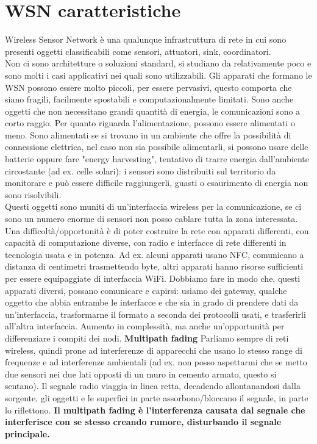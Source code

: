 \documentclass[12pt,italian]{report}
\begin{document}
\section{WSN caratteristiche}
\label{sec:WSNcar}
Wireless Sensor Network è una qualunque infrastruttura di rete in cui sono presenti oggetti classificabili come sensori, attuatori, sink, coordinatori. \\ Non ci sono architetture o soluzioni standard, si studiano da relativamente poco e sono molti i casi applicativi nei quali sono utilizzabili. 
\bigbreak
Gli apparati che formano le WSN possono essere molto piccoli, per essere pervasivi, questo comporta che siano fragili, facilmente spostabili e computazionalmente limitati. Sono anche oggetti che non necessitano grandi quantità di energia, le comunicazioni sono a corto raggio. 
\bigbreak
Per quanto riguarda l'alimentazione, possono essere alimentati o meno. Sono alimentati se si trovano in un ambiente che offre la possibilità di connessione elettrica, nel caso non sia possibile alimentarli, si possono usare delle batterie oppure fare "energy harvesting", tentativo di trarre energia dall'ambiente circostante (ad ex. celle solari): i sensori sono distribuiti sul territorio da monitorare e può essere difficile raggiungerli, guasti o esaurimento di energia non sono risolvibili. \\ Questi oggetti sono muniti di un'interfaccia wireless per la comunicazione, se ci sono un numero enorme di sensori non posso cablare tutta la zona interessata. 
\bigbreak
Una difficoltà/opportunità è di poter costruire la rete con apparati differenti, con capacità di computazione diverse, con radio e interfacce di rete differenti in tecnologia usata e in potenza. Ad ex. alcuni apparati usano NFC, comunicano a distanza di centimetri trasmettendo byte, altri apparati hanno risorse sufficienti per essere equipaggiate di interfaccia WiFi. Dobbiamo fare in modo che, questi apparati diversi, possano comunicare e capirsi: usiamo dei gateway, qualche oggetto che abbia entrambe le interfacce e che sia in grado di prendere dati da un'interfaccia, trasformarne il formato a seconda dei protocolli usati, e trasferirli all'altra interfaccia. Aumento in complessità, ma anche un'opportunità per differenziare i compiti dei nodi. 
\bigbreak
\noindent \textbf{Multipath fading}
\bigbreak
\noindent Parliamo sempre di reti wireless, quindi prone ad interferenze di apparecchi che usano lo stesso range di frequenze e ad interferenze ambientali (ad ex. non posso aspettarmi che se metto due sensori nei due lati opposti di un muro in cemento armato, questo si sentano). Il segnale radio viaggia in linea retta, decadendo allontanandosi dalla sorgente, gli oggetti e le superfici in parte assorbono/bloccano il segnale, in parte lo riflettono. \textbf{Il multipath fading è l'interferenza causata dal segnale che interferisce con se stesso creando rumore, disturbando il segnale principale. }
\end{document}
